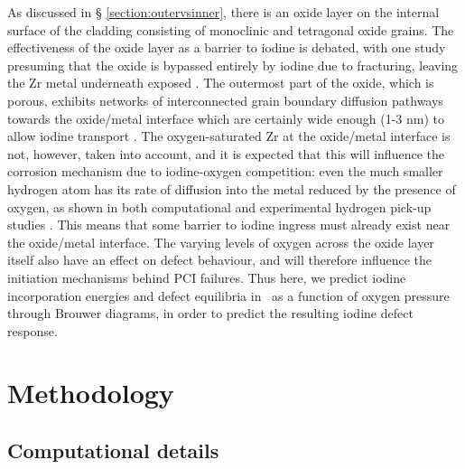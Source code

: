 As discussed in § \ref{section:outervsinner}, there is an oxide layer on the internal surface of the cladding consisting of monoclinic and tetragonal oxide grains. The effectiveness of the oxide layer as a barrier to iodine is debated, with one study presuming that the oxide is bypassed entirely by iodine due to fracturing, leaving the Zr metal underneath exposed \cite{rossi2015first}. The outermost part of the oxide, which is porous, exhibits networks of interconnected grain boundary diffusion pathways towards the oxide/metal interface which are certainly wide enough (1-3 nm) to allow iodine transport \cite{ni2010porosity}. The oxygen-saturated Zr at the oxide/metal interface is not, however, taken into account, and it is expected that this will influence the corrosion mechanism due to iodine-oxygen competition: even the much smaller hydrogen atom has its rate of diffusion into the metal reduced by the presence of oxygen, as shown in both computational \cite{glazoff2014oxidation} and experimental hydrogen pick-up studies \cite{couet2014hydrogen}. This means that some barrier to iodine ingress must already exist near the oxide/metal interface. The varying levels of oxygen across the oxide layer itself also have an effect on defect behaviour, and will therefore influence the initiation mechanisms behind PCI failures. Thus here, we predict iodine incorporation energies and defect equilibria in \zirconia\ as a function of oxygen pressure through Brouwer diagrams, in order to predict the resulting iodine defect response.


%
%

\section{Methodology}
\subsection{Computational details}

